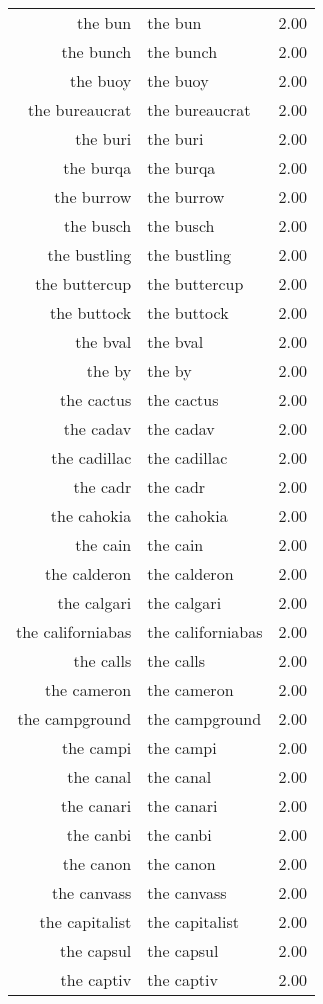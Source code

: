 \begin{table}[ht]
\begin{tabular}{rlr}
  the bun & the bun & 2.00 \\ 
  the bunch & the bunch & 2.00 \\ 
  the buoy & the buoy & 2.00 \\ 
  the bureaucrat & the bureaucrat & 2.00 \\ 
  the buri & the buri & 2.00 \\ 
  the burqa & the burqa & 2.00 \\ 
  the burrow & the burrow & 2.00 \\ 
  the busch & the busch & 2.00 \\ 
  the bustling & the bustling & 2.00 \\ 
  the buttercup & the buttercup & 2.00 \\ 
  the buttock & the buttock & 2.00 \\ 
  the bval & the bval & 2.00 \\ 
  the by & the by & 2.00 \\ 
  the cactus & the cactus & 2.00 \\ 
  the cadav & the cadav & 2.00 \\ 
  the cadillac & the cadillac & 2.00 \\ 
  the cadr & the cadr & 2.00 \\ 
  the cahokia & the cahokia & 2.00 \\ 
  the cain & the cain & 2.00 \\ 
  the calderon & the calderon & 2.00 \\ 
  the calgari & the calgari & 2.00 \\ 
  the californiabas & the californiabas & 2.00 \\ 
  the calls & the calls & 2.00 \\ 
  the cameron & the cameron & 2.00 \\ 
  the campground & the campground & 2.00 \\ 
  the campi & the campi & 2.00 \\ 
  the canal & the canal & 2.00 \\ 
  the canari & the canari & 2.00 \\ 
  the canbi & the canbi & 2.00 \\ 
  the canon & the canon & 2.00 \\ 
  the canvass & the canvass & 2.00 \\ 
  the capitalist & the capitalist & 2.00 \\ 
  the capsul & the capsul & 2.00 \\ 
  the captiv & the captiv & 2.00 \\ 

\end{tabular}
\end{table}
